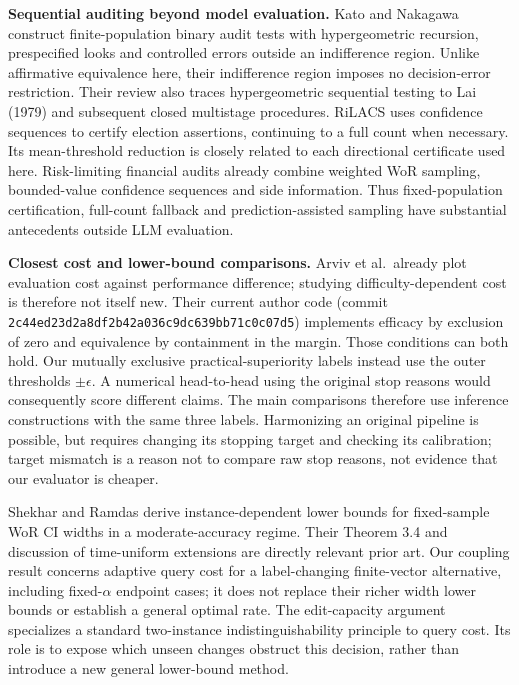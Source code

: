 \textbf{Sequential auditing beyond model evaluation.} Kato and Nakagawa \citep{r18} construct finite-population binary audit tests with hypergeometric recursion, prespecified looks and controlled errors outside an indifference region. Unlike affirmative equivalence here, their indifference region imposes no decision-error restriction. Their review also traces hypergeometric sequential testing to Lai (1979) and subsequent closed multistage procedures. RiLACS \citep{r19} uses confidence sequences to certify election assertions, continuing to a full count when necessary. Its mean-threshold reduction is closely related to each directional certificate used here. Risk-limiting financial audits \citep{r20} already combine weighted WoR sampling, bounded-value confidence sequences and side information. Thus fixed-population certification, full-count fallback and prediction-assisted sampling have substantial antecedents outside LLM evaluation.

\textbf{Closest cost and lower-bound comparisons.} Arviv et al.~already plot evaluation cost against performance difference; studying difficulty-dependent cost is therefore not itself new. Their current author code (commit \texttt{2c44ed23d2a8df2b42a036c9dc639bb71c0c07d5}) implements efficacy by exclusion of zero and equivalence by containment in the margin. Those conditions can both hold. Our mutually exclusive practical-superiority labels instead use the outer thresholds \(\pm\)\(\epsilon\). A numerical head-to-head using the original stop reasons would consequently score different claims. The main comparisons therefore use inference constructions with the same three labels. Harmonizing an original pipeline is possible, but requires changing its stopping target and checking its calibration; target mismatch is a reason not to compare raw stop reasons, not evidence that our evaluator is cheaper.

Shekhar and Ramdas \citep{r17} derive instance-dependent lower bounds for fixed-sample WoR CI widths in a moderate-accuracy regime. Their Theorem 3.4 and discussion of time-uniform extensions are directly relevant prior art. Our coupling result concerns adaptive query cost for a label-changing finite-vector alternative, including fixed-\(\alpha\) endpoint cases; it does not replace their richer width lower bounds or establish a general optimal rate. The edit-capacity argument specializes a standard two-instance indistinguishability principle to query cost. Its role is to expose which unseen changes obstruct this decision, rather than introduce a new general lower-bound method.
